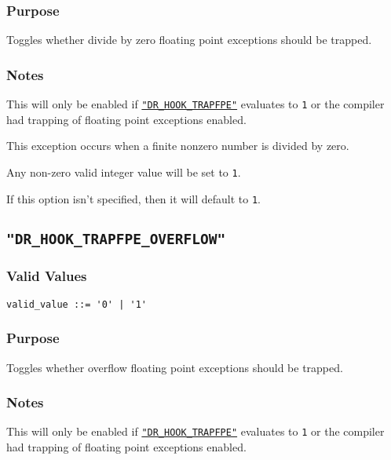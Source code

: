 \vspace{-2ex}
\subsubsection{Purpose}
\vspace{-2ex}
Toggles whether divide by zero floating point exceptions should be trapped.

\vspace{-2ex}
\subsubsection{Notes}
\vspace{-2ex}
This will only be enabled if \hyperref[section:flags:DR_HOOK_TRAPFPE]{\texttt{"DR\_HOOK\_TRAPFPE"}} evaluates to \texttt{1} or the compiler had trapping of floating point exceptions enabled.

This exception occurs when a finite nonzero number is divided by zero.

Any non-zero valid integer value will be set to \verb|1|.

If this option isn't specified, then it will default to \verb|1|.



\subsection{\texttt{"DR\_HOOK\_TRAPFPE\_OVERFLOW"}}
\label{section:flags:}
\vspace{-2ex}
\subsubsection{Valid Values}
\vspace{-2ex}
\verb+valid_value ::= '0' | '1'+ 

\vspace{-2ex}
\subsubsection{Purpose}
\vspace{-2ex}
Toggles whether overflow floating point exceptions should be trapped.

\vspace{-2ex}
\subsubsection{Notes}
\vspace{-2ex}
This will only be enabled if \hyperref[section:flags:DR_HOOK_TRAPFPE]{\texttt{"DR\_HOOK\_TRAPFPE"}} evaluates to \texttt{1} or the compiler had trapping of floating point exceptions enabled.

